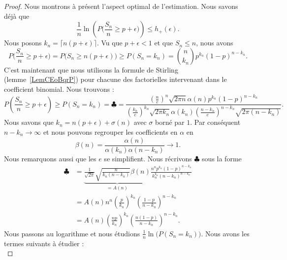 \begin{proof}
	Nous montrons à présent l'aspect optimal de l'estimation. Nous savons déjà que
	\begin{equation}    \label{EqUIplgUD}
		\frac{1}{ n }\ln\left( P\big( \frac{ S_n }{ n }\geq p+\epsilon \big) \right)\leq h_+(\epsilon).
	\end{equation}
	Nous posons \( k_n=\lceil n(p+\epsilon)\rceil\). Vu que \( p+\epsilon<1\) et que \( S_n\leq n\), nous avons
	\begin{equation}
		P\big( \frac{ S_n }{ n }\geq p+\epsilon \big)=P\big( S_n\geq n(p+\epsilon) \big)\geq P(S_n=k_n)=\binom{ n }{ k_n }p^{k_n}(1-p)^{n-k_n}.
	\end{equation}
	C'est maintenant que nous utilisons la formule de Stirling (lemme~\ref{LemCEoBqrP}) pour chacune des factorielles intervenant dans le coefficient binomial. Nous trouvons :
	\begin{equation}
		P\left( \frac{ S_n }{ n }\geq p+\epsilon \right)\geq P(S_n=k_n)=  \clubsuit= \frac{ \left( \frac{ n }{ e } \right)^n\sqrt{2\pi n}\alpha(n)p^{k_n}(1-p)^{n-k_n} }{ \left( \frac{ k_n }{ e } \right)^{k_n}\sqrt{2\pi k_n}\alpha(k_n)\left( \frac{ n-k_n }{ e } \right)^{n-k_n}\sqrt{2\pi(n-k_n)} }.
	\end{equation}
	Nous savons que \( k_n=n(p+\epsilon)+\sigma(n)\) avec \( \sigma\) borné par \( 1\). Par conséquent \( n-k_n\to \infty\) et nous pouvons regrouper les coefficients en \( \alpha\) en
	\begin{equation}
		\beta(n)=\frac{ \alpha(n) }{ \alpha(k_n)\alpha(n-k_n) }\to 1.
	\end{equation}
	Nous remarquons aussi que les \( e\) se simplifient. Nous récrivons \( \clubsuit\) sous la forme
	\begin{subequations}
		\begin{align}
			\clubsuit & =\underbrace{\frac{1}{ \sqrt{2\pi} }\sqrt{\frac{ n }{ k_n(n-k_n) }}\beta(n) }_{=A(n)}  \frac{ n^np^{k_n}(1-p)^{n-k_n} }{ k_n^{k_n}(n-k_n)^{n-k_n} } \\
			          & =A(n)n^n\left( \frac{ p }{ k_n } \right)^{k_n}\left( \frac{ 1-p }{ n-k_n } \right)^{n-k_n}                                                          \\
			          & =A(n)\left( \frac{ np }{ k_n } \right)^{k_n}\left( \frac{ n(1-p) }{ n-k_n } \right)^{n-k_n}.
		\end{align}
	\end{subequations}
	Nous passons au logarithme et nous étudions \( \frac{1}{ n }\ln\big( P(S_n=k_n) \big)\). Nous avons les termes suivants à étudier :
	\begin{equation}

\end{equation}
\end{proof}
